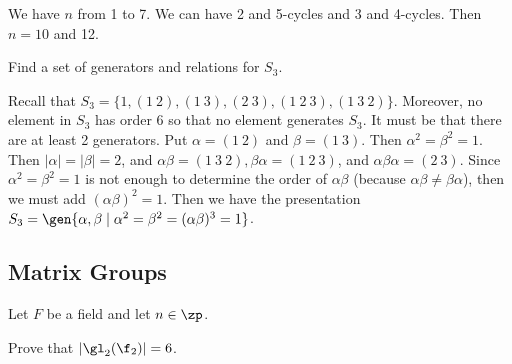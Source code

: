 \begin{sol}
    We have $n$ from 1 to 7. We can have 2 and 5-cycles and 3 and 4-cycles. Then $n = 10$ and 12.
\end{sol}

\begin{exercise} \label{ex1.3.20}
    Find a set of generators and relations for $S_3$.
\end{exercise}

\begin{sol}
    Recall that $S_3 = \{1, (1\ 2), (1\ 3), (2\ 3), (1\ 2\ 3), (1\ 3\ 2)\}$. Moreover, no element in $S_3$ has order 6 so that no element generates $S_3$. It must be that there are at least 2 generators. Put $\alpha = (1\ 2)$ and $\beta = (1\ 3)$. Then $\alpha^2 = \beta^2 = 1$. Then $|\alpha| = |\beta| = 2$, and $\alpha\beta = (1\ 3\ 2), \beta\alpha = (1\ 2\ 3)$, and $\alpha\beta\alpha = (2\ 3)$. Since $\alpha^2 = \beta^2 = 1$ is not enough to determine the order of $\alpha\beta$ (because $\alpha\beta \neq \beta\alpha$), then we must add $(\alpha\beta)^2 = 1$. Then we have the presentation $S_3 = \gen{\alpha, \beta \mid \alpha^2 = \beta^2 = (\alpha\beta)^3 = 1}$.
\end{sol}

\newpage

\subsection{Matrix Groups}

Let $F$ be a field and let $n \in \zp$.

\begin{exercise}\label{ex1.4.1}
    Prove that $|\gl_2(\f_2)| = 6$.
\end{exercise}

